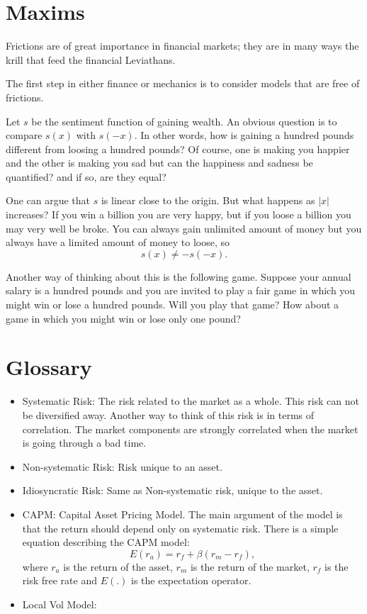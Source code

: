 \documentclass{amsart}
\theoremstyle{plain}
\numberwithin{equation}{section}
\begin{document}
\section*{Maxims}
Frictions are of great importance in financial markets;
they are in many ways the krill that feed the financial 
Leviathans.

The first step in either finance or mechanics is to 
consider models that are free of frictions. 

Let $s$ be the sentiment function of 
gaining wealth. An obvious question is
to compare $s(x)$ with $s(-x)$. In other words,
how is gaining a hundred pounds different from 
loosing a hundred pounds? Of course, one is making 
you happier and the other is making you sad but 
can the happiness and sadness be quantified? and 
if so, are they equal?

One can argue that $s$ is linear close to the 
origin. But what happens as $|x|$ increases?
If you win a billion you are very happy, but if you 
loose a billion you may very well be broke. You can 
always gain unlimited amount of money but you always 
have a limited amount of money to loose, so 
\begin{equation}
s(x) \neq -s(-x).
\end{equation}

Another way of thinking about this is the following 
game. Suppose your annual salary is a hundred pounds
and you are invited to play a fair game in which you 
might win or lose a hundred pounds. Will you play that 
game? How about a game in which you might win or lose 
only one pound?

\section{Glossary}
\begin{itemize}
\item Systematic Risk: The risk related to the market as a whole. This 
risk can not be diversified away. Another way to think of this risk 
is in terms of correlation. The market components are strongly correlated
when the market is going through a bad time.
\item Non-systematic Risk: Risk unique to an asset.
\item Idiosyncratic Risk: Same as Non-systematic risk, unique to the asset.
\item CAPM: Capital Asset Pricing Model. The main argument of the model is that 
the return should depend only on systematic risk. There is a simple 
equation describing the CAPM model:
\begin{equation}
E(r_a) = r_f + \beta( r_m - r_f ),
\label{eq:capm}
\end{equation}
where $r_a$ is the return of the asset,
$r_m$ is the return of the market, 
$r_f$ is the risk free rate and $E(.)$ is 
the expectation operator. 
	
\item Local Vol Model: 
\end{itemize}
\end{document}
